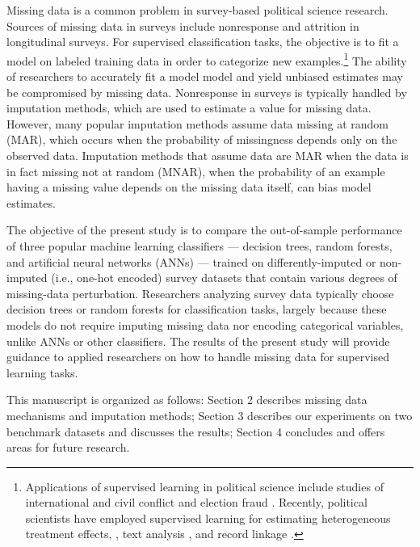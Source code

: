 \documentclass[10pt]{book}
\theoremstyle{definition}
\begin{document}
Missing data is a common problem in survey-based political science research. Sources of missing data in surveys include nonresponse and attrition in longitudinal surveys. For supervised classification tasks, the objective is to fit a model on labeled training data in order to categorize new examples.\footnote{Applications of supervised learning in political science include studies of international and civil conflict\citep{beck2000,de2004,hill2014,muchlinski2016} and election fraud \citep{cantu2011,montgomery2015}. Recently, political scientists have employed supervised learning for estimating heterogeneous treatment effects, \citep{imai2011,green2012, imai2013, grimmer2014}, text analysis \citep{quinn2010,hopkins2010,grimmer2013,lauderdale2014,wilkerson2015}, and record linkage \citep{giraud2010}.} The ability of researchers to accurately fit a model model and yield unbiased estimates may be compromised by missing data. Nonresponse in surveys is typically handled by imputation methods, which are used to estimate a value for missing data. However, many popular imputation methods assume data missing at random (MAR), which occurs when the probability of missingness depends only on the observed data. Imputation methods that assume data are MAR when the data is in fact missing not at random (MNAR), when the probability of an example having a missing value depends on the missing data itself, can bias model estimates. 

The objective of the present study is to compare the out-of-sample performance of three popular machine learning classifiers --- decision trees, random forests, and artificial neural networks (ANNs) --- trained on differently-imputed or non-imputed (i.e., one-hot encoded) survey datasets that contain various degrees of missing-data perturbation. Researchers analyzing survey data typically choose decision trees or random forests for classification tasks, largely because these models do not require imputing missing data nor encoding categorical variables, unlike ANNs or other classifiers. The results of the present study will provide guidance to applied researchers on how to handle missing data for supervised learning tasks. 

This manuscript is organized as follows: Section 2 describes missing data mechanisms and imputation methods; Section 3 describes our experiments on two benchmark datasets and discusses the results; Section 4 concludes and offers areas for future research. 

\par
\end{document}

